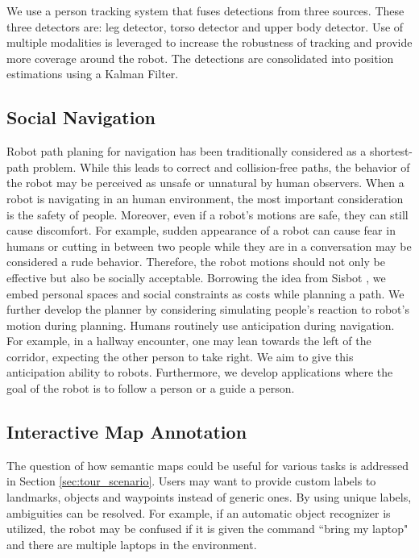 \documentclass[12pt]{gatech-thesis}
\begin{document}
We use a person tracking system that fuses detections from three sources. These three detectors are: leg detector, torso detector and upper body detector. Use of multiple modalities is leveraged to increase the robustness of tracking and provide more coverage around the robot. The detections are consolidated into position estimations using a Kalman Filter.

\subsection{Social Navigation}

Robot path planing for navigation has been traditionally considered as a shortest-path problem. While this leads to correct and collision-free paths, the behavior of the robot may be perceived as unsafe or unnatural by human observers. When a robot is navigating in an human environment, the most important consideration is the safety of people. Moreover, even if a robot's motions are safe, they can still cause discomfort. For example, sudden appearance of a robot can cause fear in humans or cutting in between two people while they are in a conversation may be considered a rude behavior. Therefore, the robot motions should not only be effective but also be socially acceptable.
Borrowing the idea from Sisbot \cite{sisbot2007human}, we embed personal spaces and social constraints as costs while planning a path. We further develop the planner by considering simulating people's reaction to robot's motion during planning. Humans routinely use anticipation during navigation. For example, in a hallway encounter, one may lean towards the left of the corridor, expecting the other person to take right. We aim to give this anticipation ability to robots. Furthermore, we develop applications where the goal of the robot is to follow a person or a guide a person.

\subsection{Interactive Map Annotation}

The question of how semantic maps could be useful for various tasks is addressed in Section \ref{sec:tour_scenario}. Users may want to provide custom labels to landmarks, objects and waypoints instead of generic ones. By using unique labels, ambiguities can be resolved. For example, if an automatic object recognizer is utilized, the robot may be confused if it is given the command ``bring my laptop" and there are multiple laptops in the environment.
\end{document}
